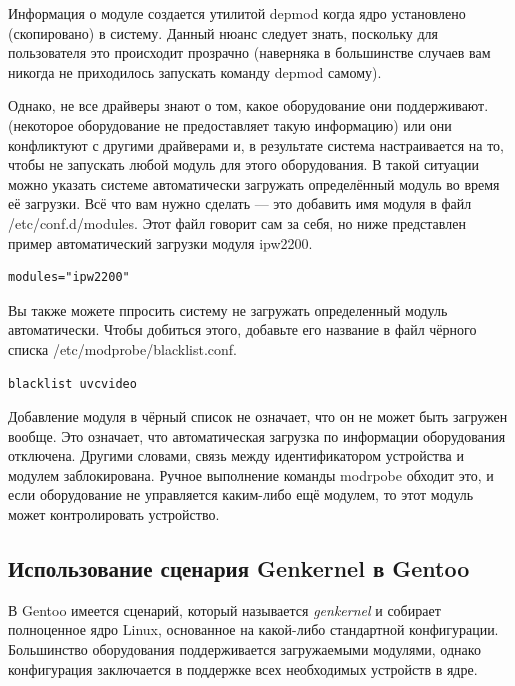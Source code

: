 \documentclass[10pt]{book}
\begin{document}
Информация о модуле создается утилитой depmod когда ядро установлено (скопировано) в систему. Данный нюанс следует знать, поскольку для пользователя это происходит прозрачно (наверняка в большинстве случаев вам никогда не приходилось запускать команду depmod самому).

Однако, не все драйверы знают о том, какое оборудование они поддерживают. (некоторое оборудование не предоставляет такую информацию) или они конфликтуют с другими драйверами и, в результате система настраивается на то, чтобы не запускать любой модуль для этого оборудования. В такой ситуации можно указать системе автоматически загружать определённый модуль во время её загрузки. Всё что вам нужно сделать — это добавить имя модуля в файл /etc/conf.d/modules. Этот файл говорит сам за себя, но ниже представлен пример автоматический загрузки модуля ipw2200.

\vspace{3mm}
\begin{tcolorbox}
\begin{lstlisting}
modules="ipw2200"
\end{lstlisting}
\end{tcolorbox}

Вы также можете ппросить систему не загружать определенный модуль автоматически. Чтобы добиться этого, добавьте его название в файл чёрного списка /etc/modprobe/blacklist.conf.

\vspace{3mm}
\begin{tcolorbox}
\begin{lstlisting}
blacklist uvcvideo
\end{lstlisting}
\end{tcolorbox}

Добавление модуля в чёрный список не означает, что он не может быть загружен вообще. Это означает, что автоматическая загрузка по информации оборудования отключена. Другими словами, связь между идентификатором устройства и модулем заблокирована. Ручное выполнение команды modrpobe обходит это, и если оборудование не управляется каким-либо ещё модулем, то этот модуль может контролировать устройство.

\subsection{Использование сценария Genkernel в Gentoo}

В Gentoo имеется сценарий, который называется \textit{genkernel} и собирает полноценное ядро Linux, основанное на какой-либо стандартной конфигурации.     Большинство оборудования поддерживается загружаемыми модулями, однако конфигурация заключается в поддержке всех необходимых устройств в ядре.
\end{document}
